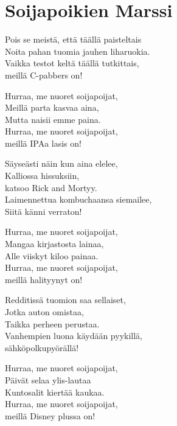 \section{Soijapoikien Marssi}
Pois se meistä, että täällä paisteltais\\
Noita pahan tuomia jauhen liharuokia.\\
Vaikka testot keltä täällä tutkittais,\\
meillä C-pabbers on!

Hurraa, me nuoret soijapoijat,\\
Meillä parta kasvaa aina,\\
Mutta naisii emme paina.\\
Hurraa, me nuoret soijapoijat,\\
meillä IPAa lasis on!

Säyseästi näin kun aina elelee,\\
Kalliossa hissuksiin,\\
katsoo Rick and Mortyy.\\
Laimennettua kombuchaansa siemailee,\\
Siitä känni verraton!

Hurraa, me nuoret soijapoijat,\\
Mangaa kirjastosta lainaa,\\
Alle viiskyt kiloo painaa.\\
Hurraa, me nuoret soijapoijat,\\
meillä halityynyt on!

Redditissä tuomion saa sellaiset,\\
Jotka auton omistaa,\\
Taikka perheen perustaa.\\
Vanhempien luona käydään pyykillä,\\
sähköpolkupyörällä!

Hurraa, me nuoret soijapoijat,\\
Päivät selaa ylis-lautaa\\
Kuntosalit kiertää kaukaa.\\
Hurraa, me nuoret soijapoijat,\\
meillä Disney plussa on!